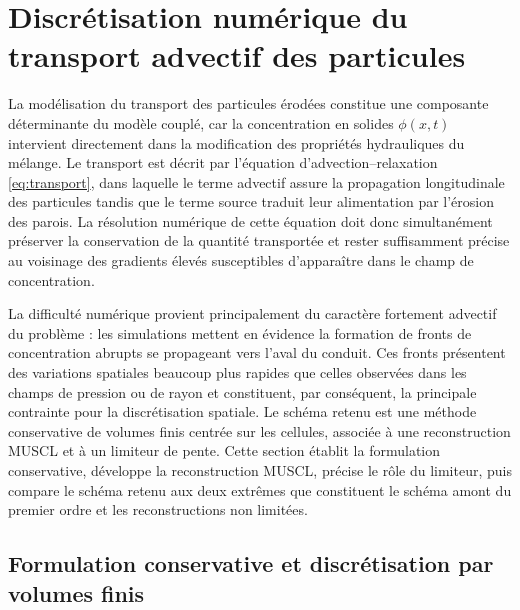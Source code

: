 \documentclass[11pt,a4paper]{report}
\begin{document}


\section{Discrétisation numérique du transport advectif des particules}
\label{sec:transport}

La modélisation du transport des particules érodées constitue une composante déterminante du modèle
couplé, car la concentration en solides \(\phi(x,t)\) intervient directement dans la modification des
propriétés hydrauliques du mélange. Le transport est décrit par l'équation d'advection--relaxation
\eqref{eq:transport}, dans laquelle le terme advectif assure la propagation longitudinale des particules
tandis que le terme source traduit leur alimentation par l'érosion des parois. La résolution numérique de
cette équation doit donc simultanément préserver la conservation de la quantité transportée et rester
suffisamment précise au voisinage des gradients élevés susceptibles d'apparaître dans le champ de
concentration.

La difficulté numérique provient principalement du caractère fortement advectif du problème : les
simulations mettent en évidence la formation de fronts de concentration abrupts se propageant vers l'aval
du conduit. Ces fronts présentent des variations spatiales beaucoup plus rapides que celles observées dans
les champs de pression ou de rayon et constituent, par conséquent, la principale contrainte pour la
discrétisation spatiale. Le schéma retenu est une méthode conservative de volumes finis centrée sur les
cellules, associée à une reconstruction MUSCL et à un limiteur de pente. Cette section établit la
formulation conservative, développe la reconstruction MUSCL, précise le rôle du limiteur, puis compare le
schéma retenu aux deux extrêmes que constituent le schéma amont du premier ordre et les reconstructions
non limitées.

\subsection{Formulation conservative et discrétisation par volumes finis}
\end{document}
